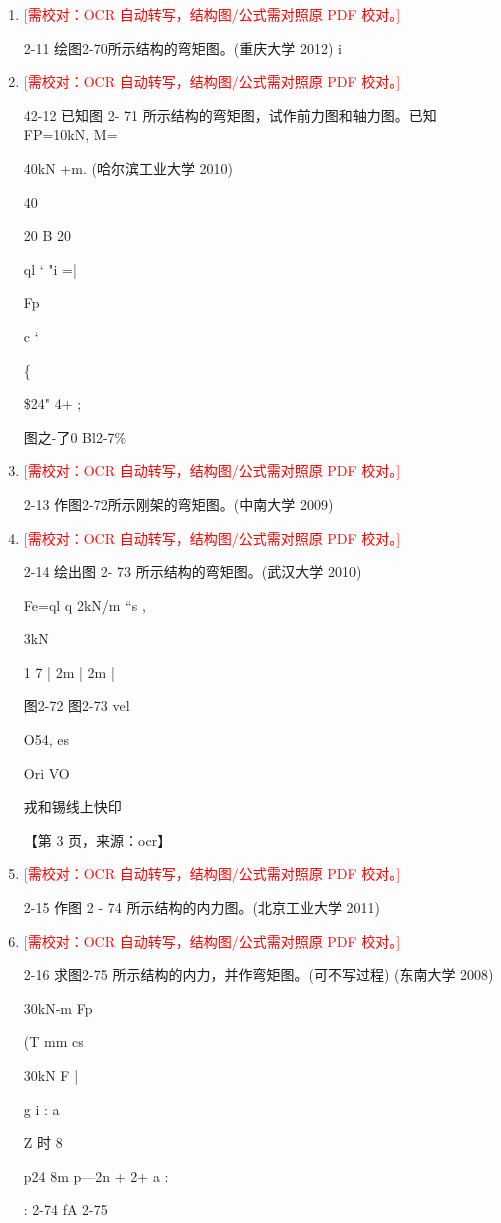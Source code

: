 \documentclass[UTF8,12pt,a4paper,openany]{ctexbook}
\newcommand{\TODO}[1]{\textcolor{red}{[需校对：#1]}}
\begin{document}
\begin{enumerate}[label=\textbf{\arabic*.},leftmargin=2em]
\item \TODO{OCR 自动转写，结构图/公式需对照原 PDF 校对。}\par 2-11 绘图2-70所示结构的弯矩图。(重庆大学 2012)                                               i
\item \TODO{OCR 自动转写，结构图/公式需对照原 PDF 校对。}\par 42-12 已知图 2- 71 所示结构的弯矩图，试作前力图和轴力图。已知 FP=10kN, M=\par 40kN +m. (哈尔滨工业大学 2010)\par 40\par 20          B         20\par ql                             ‘ "i        =|\par Fp\par c                              ‘\par \{\par \$24" 4+               ;\par 图之-了0                                  Bl2-7\%
\item \TODO{OCR 自动转写，结构图/公式需对照原 PDF 校对。}\par 2-13 作图2-72所示刚架的弯矩图。(中南大学 2009)
\item \TODO{OCR 自动转写，结构图/公式需对照原 PDF 校对。}\par 2-14 绘出图 2- 73 所示结构的弯矩图。(武汉大学 2010)\par Fe=ql          q                        2kN/m        “s               ,\par 3kN\par 1           7                  |   2m   |    2m   |\par 图2-72                图2-73       vel\par O54, es\par Ori VO\par 戎和锡线上快印\par \par 【第 3 页，来源：ocr】
\item \TODO{OCR 自动转写，结构图/公式需对照原 PDF 校对。}\par 2-15 作图 2 - 74 所示结构的内力图。(北京工业大学 2011)
\item \TODO{OCR 自动转写，结构图/公式需对照原 PDF 校对。}\par 2-16 求图2-75 所示结构的内力，并作弯矩图。(可不写过程) (东南大学 2008)\par 30kN-m                               Fp\par (T               mm                             cs\par 30kN         F                         |\par g                                i :                      a\par Z                            时     8\par p24  8m   p—2n +        2+ a :\par : 2-74                                         fA 2-75

\end{enumerate}
\end{document}
